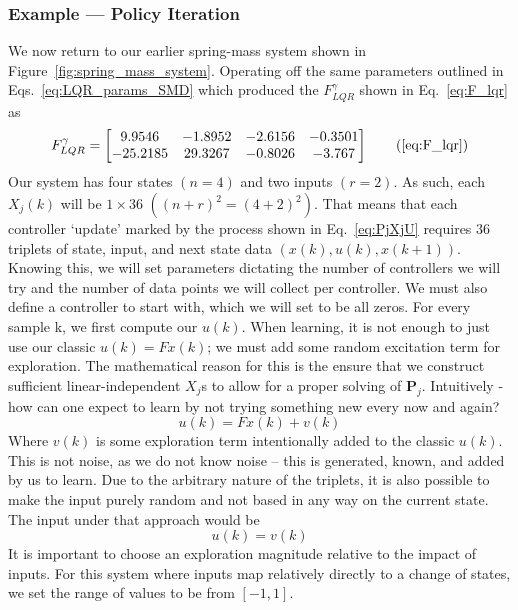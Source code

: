 \FloatBarrier\subsubsection{Example --- Policy Iteration} %
We now return to our earlier spring-mass system shown in Figure~\ref{fig:spring_mass_system}. Operating off the same parameters outlined in Eqs.~\ref{eq:LQR_params_SMD} which produced the $F_{LQR}^\gamma$ shown in Eq.~\ref{eq:F_lqr} as
\begin{equation}
    F_{LQR}^\gamma=\left[\begin{matrix}9.9546&-1.8952&-2.6156&-0.3501\\-25.2185&29.3267&-0.8026&-3.767\\\end{matrix}\right]
    \tag{\ref{eq:F_lqr}}
\end{equation}
Our system has four states $(n=4)$ and two inputs $(r=2)$. As such, each $X_j\left(k\right)$ will be $1\times 36$ $({\left(n+r\right)}^2={\left(4+2\right)}^2)$. That means that each controller `update' marked by the process shown in Eq.~\ref{eq:PjXjU} requires 36 triplets of state, input, and next state data $(x(k), u(k), x(k+1))$.
Knowing this, we will set parameters dictating the number of controllers we will try and the number of data points we will collect per controller. We must also define a controller to start with, which we will set to be all zeros.
For every sample k, we first compute our $u\left(k\right)$. When learning, it is not enough to just use our classic $u\left(k\right)=Fx\left(k\right)$; we must add some random excitation term for exploration. The mathematical reason for this is the ensure that we construct sufficient linear-independent $X_j$s to allow for a proper solving of $\textbf{P}_j$. Intuitively - how can one expect to learn by not trying something new every now and again?
\begin{equation}
    u\left(k\right)=Fx\left(k\right)+v\left(k\right)
    \label{eq:input_with_exploration}
\end{equation}
Where $v\left(k\right)$ is some exploration term intentionally added to the classic $u\left(k\right)$. This is not noise, as we do not know noise -- this is generated, known, and added by us to learn. Due to the arbitrary nature of the triplets, it is also possible to make the input purely random and not based in any way on the current state. The input under that approach would be
\begin{equation}
    u\left(k\right)=v\left(k\right)
\end{equation}
It is important to choose an exploration magnitude relative to the impact of inputs. For this system where inputs map relatively directly to a change of states, we set the range of values to be from $\left[-1,1\right]$. 


